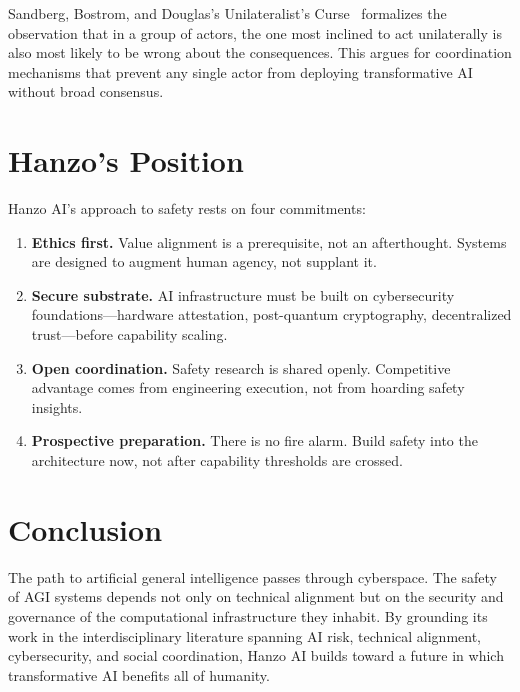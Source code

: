 \documentclass[11pt,twocolumn]{article}
\begin{document}
Sandberg, Bostrom, and Douglas's Unilateralist's
Curse~\cite{sandberg2016unilateralist} formalizes the observation that in a
group of actors, the one most inclined to act unilaterally is also most likely
to be wrong about the consequences. This argues for coordination mechanisms
that prevent any single actor from deploying transformative AI without broad
consensus.

\section{Hanzo's Position}
\label{sec:position}

Hanzo AI's approach to safety rests on four commitments:

\begin{enumerate}[leftmargin=1.1em]
    \item \textbf{Ethics first.} Value alignment is a prerequisite, not an
    afterthought. Systems are designed to augment human agency, not supplant it.
    \item \textbf{Secure substrate.} AI infrastructure must be built on
    cybersecurity foundations---hardware attestation, post-quantum cryptography,
    decentralized trust---before capability scaling.
    \item \textbf{Open coordination.} Safety research is shared openly.
    Competitive advantage comes from engineering execution, not from hoarding
    safety insights.
    \item \textbf{Prospective preparation.} There is no fire alarm. Build safety
    into the architecture now, not after capability thresholds are crossed.
\end{enumerate}

\section{Conclusion}
\label{sec:conclusion}

The path to artificial general intelligence passes through cyberspace. The
safety of AGI systems depends not only on technical alignment but on the
security and governance of the computational infrastructure they inhabit. By
grounding its work in the interdisciplinary literature spanning AI risk,
technical alignment, cybersecurity, and social coordination, Hanzo AI builds
toward a future in which transformative AI benefits all of humanity.
\end{document}
